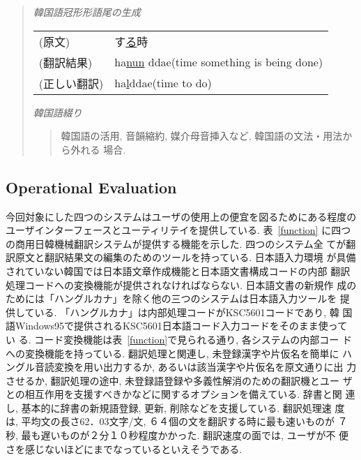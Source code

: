 \begin{quote}
\vspace{0.5cm}

\begin{flushleft}
{\it 韓国語冠形形語尾の生成}
\end{flushleft}

\begin{tabular}{ll}
  (原文)      & す\underline{る}時 \\
  (翻訳結果)  & ha\underline{nun} ddae(time something is being done) \\
  (正しい翻訳) & ha\underline{l}ddae(time to do) \\
\end{tabular}

\vspace{0.5cm}

\begin{flushleft}
{\it 韓国語綴り}
\end{flushleft}

\begin{quote}
韓国語の活用, 音韻縮約, 媒介母音挿入など, 韓国語の文法・用法から外れる
場合. 
\end{quote}

\end{quote}


\subsection{Operational Evaluation}
今回対象にした四つのシステムはユーザの使用上の便宜を図るためにある程度の
ユーザインターフェースとユーティリテイを提供している. 表~\ref{function}
に四つの商用日韓機械翻訳システムが提供する機能を示した. 四つのシステム全
てが翻訳原文と翻訳結果文の編集のためのツールを持っている. 日本語入力環境
が具備されていない韓国では日本語文章作成機能と日本語文書構成コードの内部
翻訳処理コードへの変換機能が提供されなければならない. 日本語文書の新規作
成のためには「ハングルカナ」を除く他の三つのシステムは日本語入力ツールを
提供している. 「ハングルカナ」は内部処理コードがKSC5601コードであり, 韓
国語Windows95で提供されるKSC5601日本語コード入力コードをそのまま使ってい
る. コード変換機能は表~\ref{function}で見られる通り, 各システムの内部コー
ドへの変換機能を持っている. 翻訳処理と関連し, 未登録漢字や片仮名を簡単に
ハングル音読変換を用い出力するか, あるいは該当漢字や片仮名を原文通りに出
力させるか, 翻訳処理の途中, 未登録語登録や多義性解消のための翻訳機とユー
ザとの相互作用を支援すべきかなどに関するオプションを備えている. 辞書と関
連し, 基本的に辞書の新規語登録, 更新, 削除などを支援している. 翻訳処理速
度は, 平均文の長さ62．03文字/文, ６４個の文を翻訳する時に最も速いものが
７秒, 最も遅いものが２分１０秒程度かかった. 翻訳速度の面では, ユーザが不
便さを感じないほどにまでなっているといえそうである. 

